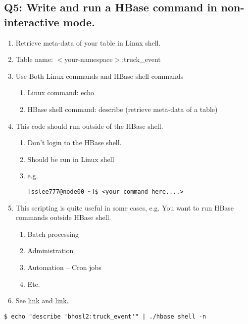 \documentclass[]{article}
\begin{document}
\subsection*{Q5: Write and run a HBase command in non-interactive mode.} 
\begin{enumerate}[before=\itshape,font=\normalfont,label=\alph*.]
	\item Retrieve meta-data of your table in Linux shell.
	\item Table name: $<$your-namespace$>$:truck\_event
	\item Use Both Linux commands and HBase shell commands
	\begin{enumerate}[label=\roman*.]
		\item Linux command: echo
		\item HBase shell command: describe (retrieve meta-data of a table)
	\end{enumerate}
	\item This code should run outside of the HBase shell.
	\begin{enumerate}[label=\roman*.]
		\item Don’t login to the HBase shell.
		\item Should be run in Linux shell
		\item e.g.%
		{\normalfont 
			\begin{verbatim}
[sslee777@node00 ~]$ <your command here....>
			\end{verbatim} 
		}
	\end{enumerate}
	\item This scripting is quite useful in some cases, e.g. You want to run HBase commands outside HBase shell. 
	\begin{enumerate}[label=\roman*.]
		\item Batch processing
		\item Administration
		\item Automation – Cron jobs
		\item Etc.
	\end{enumerate}
	\item See \href{https://hbase.apache.org/book.html#_running_the_shell_in_non_interactive_mode}{link} and 
	\href{https://hbase.apache.org/book.html#hbase.shell.noninteractive}{link.}
\end{enumerate}

\begin{verbatim}
$ echo "describe 'bhosl2:truck_event'" | ./hbase shell -n
\end{verbatim}
\end{document}

